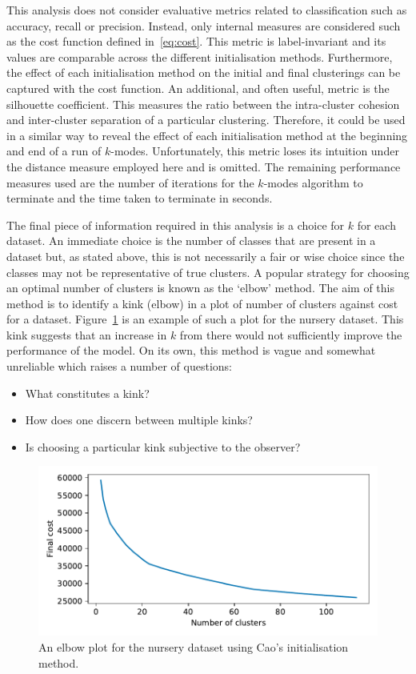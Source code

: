 This analysis does not consider evaluative metrics related to classification
such as accuracy, recall or precision. Instead, only internal measures are
considered such as the cost function defined in~\eqref{eq:cost}. This metric is
label-invariant and its values are comparable across the different
initialisation methods. Furthermore, the effect of each initialisation method
on the initial and final clusterings can be captured with the cost function. An
additional, and often useful, metric is the silhouette coefficient. This
measures the ratio between the intra-cluster cohesion and inter-cluster
separation of a particular clustering. Therefore, it could be used in a similar
way to reveal the effect of each initialisation method at the beginning and end
of a run of \(k\)-modes. Unfortunately, this metric loses its intuition under
the distance measure employed here and is omitted. The remaining performance
measures used are the number of iterations for the \(k\)-modes algorithm to
terminate and the time taken to terminate in seconds.

The final piece of information required in this analysis is a choice for \(k\)
for each dataset. An immediate choice is the number of classes that are present
in a dataset but, as stated above, this is not necessarily a fair or wise choice
since the classes may not be representative of true clusters. A popular strategy
for choosing an optimal number of clusters is known as the `elbow' method. The
aim of this method is to identify a kink (elbow) in a plot of number of clusters
against cost for a dataset. Figure~\ref{fig:nursery_costs} is an example of such
a plot for the nursery dataset. This kink suggests that an increase in \(k\)
from there would not sufficiently improve the performance of the model. On its
own, this method is vague and somewhat unreliable which raises a number of
questions:
\begin{itemize}
    \item What constitutes a kink?
    \item How does one discern between multiple kinks?
    \item Is choosing a particular kink subjective to the observer?
\end{itemize}

\begin{figure}
    \centering
    \includegraphics[width=.8\linewidth]{./img/elbow/nursery_costs.pdf}
    \caption{An elbow plot for the nursery dataset using Cao's initialisation
             method.}\label{fig:nursery_costs}
\end{figure}

